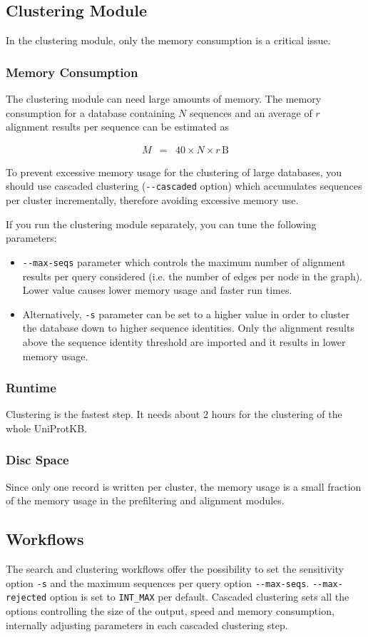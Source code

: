 \documentclass[11pt,a4paper]{scrreprt}
\begin{document}
\subsection{Clustering Module}
In the clustering module, only the memory consumption is a critical issue.
\subsubsection{Memory Consumption}
The clustering module can need large amounts of memory. The memory consumption for a database containing $N$ sequences and an average of $r$ alignment results per sequence can be estimated as

\begin{eqnarray*}
M & = & 40\times N\times r\,\mathrm{B}
\end{eqnarray*}
 
To prevent excessive memory usage for the clustering of large databases, you should use cascaded clustering (\texttt{-{}-cascaded} option) which accumulates sequences per cluster incrementally, therefore avoiding excessive memory use.

If you run the clustering module separately, you can tune the following parameters:
\begin{itemize}
\item \texttt{-{}-max-seqs} parameter which controls the maximum number of alignment results per query considered (i.e. the number of edges per node in the graph). Lower value causes lower memory usage and faster run times.
\item Alternatively, \texttt{-s} parameter can be set to a higher value in order to cluster the database down to higher sequence identities. Only the alignment results above the sequence identity threshold are imported and it results in lower memory usage. 
\end{itemize}
\subsubsection{Runtime}
Clustering is the fastest step. It needs about 2 hours for the clustering of the whole UniProtKB. 
\subsubsection{Disc Space}
Since only one record is written per cluster, the memory usage is a small fraction of the memory usage in the prefiltering and alignment modules.
\subsection{Workflows}
The search and clustering workflows offer the possibility to set the sensitivity option \texttt{-s} and the maximum sequences per query option \texttt{-{}-max-seqs}. \texttt{-{}-max-rejected} option is set to \texttt{INT\_MAX} per default. Cascaded clustering sets all the options controlling the size of the output, speed and memory consumption, internally adjusting parameters in each cascaded clustering step.
\end{document}
